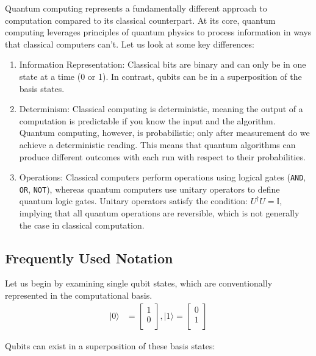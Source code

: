 \documentclass[msc,oneside]{ubcthesis}
\begin{document}
	Quantum computing represents a fundamentally different approach to computation compared to its classical counterpart. At its core, quantum computing leverages principles of quantum physics to process information in ways that classical computers can't. Let us look at some key differences:
	\begin{enumerate}
		\item 	Information Representation: Classical bits are binary and can only be in one state at a time (0 or 1). In contrast, qubits can be in a superposition of the basis states.

		\item 	Determinism: Classical computing is deterministic, meaning the output of a computation is predictable if you know the input and the algorithm. Quantum computing, however, is probabilistic; only after measurement do we achieve a deterministic reading. This means that quantum algorithms can produce different outcomes with each run with respect to their probabilities.
		
		\item Operations: Classical computers perform operations using logical gates (\texttt{AND}, \texttt{OR}, \texttt{NOT}), whereas quantum computers use unitary operators to define quantum logic gates. Unitary operators satisfy the condition: $U^{\dagger}U = \mathbb{I}$, implying that all quantum operations are reversible, which is not generally the case in classical computation.
		
	\end{enumerate}
	
	
	\subsection{Frequently Used Notation}
	
	Let us begin by examining single qubit states, which are conventionally represented in the computational basis.
	\begin{align*}	
		|0\rangle &= \begin{bmatrix}
			1 \\
			0 \\
		\end{bmatrix}, 
		|1\rangle = \begin{bmatrix}
			0 \\
			1 \\
		\end{bmatrix}
	\end{align*}
	
	Qubits can exist in a superposition of these basis states:
	
\end{document}
